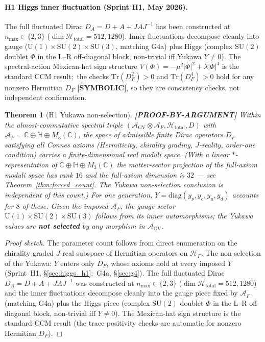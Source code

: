 \documentclass[11pt]{article}
\providecommand{\Tr}{\mathrm{Tr}}
\newtheorem{theorem}{Theorem}
\begin{document}
\paragraph{H1 Higgs inner fluctuation (Sprint H1, May 2026).}
The full fluctuated Dirac $D_A = D + A + JAJ^{-1}$ has been
constructed at $n_{\max} \in \{2, 3\}$
($\dim \mathcal{H}_{\text{total}} = 512, 1280$). Inner
fluctuations decompose cleanly into gauge
($\mathrm{U}(1) \times \mathrm{SU}(2) \times \mathrm{SU}(3)$,
matching G4a) plus Higgs (complex $\mathrm{SU}(2)$ doublet $\Phi$
in the L--R off-diagonal block, non-trivial iff Yukawa $Y \ne 0$).
The spectral-action Mexican-hat sign structure
$V(\Phi) = -\mu^2 |\Phi|^2 + \lambda |\Phi|^4$ is the standard CCM
result;\ the checks $\Tr(D_F^2) > 0$ and $\Tr(D_F^4) > 0$ hold for any
nonzero Hermitian $D_F$ \textbf{[SYMBOLIC]}, so they are consistency
checks, not independent confirmation.

\begin{theorem}[H1 Yukawa non-selection]
\label{thm:h1_yukawa_non_selection}
\textbf{[PROOF-BY-ARGUMENT]}
Within the almost-commutative spectral triple
$(\mathcal{A}_{\mathrm{GV}} \otimes \mathcal{A}_F, \mathcal{H}_{\mathrm{total}}, D)$
with $\mathcal{A}_F = \mathbb{C} \oplus \mathbb{H} \oplus M_3(\mathbb{C})$,
the space of admissible finite Dirac operators $D_F$ satisfying all
Connes axioms (Hermiticity, chirality grading, $J$-reality, order-one
condition) carries a finite-dimensional real moduli space.  (With a
linear $*$-representation of $\mathbb{C} \oplus
\mathbb{H} \oplus M_3(\mathbb{C})$ the matter-sector projection of the
full-axiom moduli space has rank $16$ and the full-axiom dimension is
$32$ --- see Theorem~\ref{thm:forced_count}. The Yukawa non-selection
conclusion is independent of this count.) For
one generation, $Y = \mathrm{diag}(y_\nu, y_e, y_u, y_d)$ accounts
for $8$ of these. Given the imposed $\mathcal{A}_F$, the gauge sector
$\mathrm{U}(1) \times \mathrm{SU}(2) \times \mathrm{SU}(3)$ follows from
its inner automorphisms; the Yukawa values are \textbf{not selected} by any
morphism in $\mathcal{A}_{\mathrm{GV}}$.
\end{theorem}

\begin{proof}[Proof sketch]
The parameter count follows from direct enumeration on the
chirality-graded $J$-real subspace of Hermitian operators on
$\mathcal{H}_F$. The non-selection of the Yukawa: $Y$ enters only
$D_F$, whose axioms hold at every imposed $Y$ (Sprint~H1,
\S\ref{sec:higgs_h1};\ G4a, \S\ref{sec:g4}). The full fluctuated Dirac $D_A = D + A + JAJ^{-1}$ was
constructed at $n_{\max} \in \{2, 3\}$
($\dim \mathcal{H}_{\text{total}} = 512, 1280$) and the inner
fluctuations decompose cleanly into the gauge piece fixed by
$\mathcal{A}_F$ (matching G4a) plus the Higgs piece (complex $\mathrm{SU}(2)$ doublet $\Phi$ in
the L--R off-diagonal block, non-trivial iff $Y \ne 0$). The
Mexican-hat sign structure is the standard CCM result (the trace
positivity checks are automatic for nonzero Hermitian $D_F$).
\end{proof}
\end{document}

